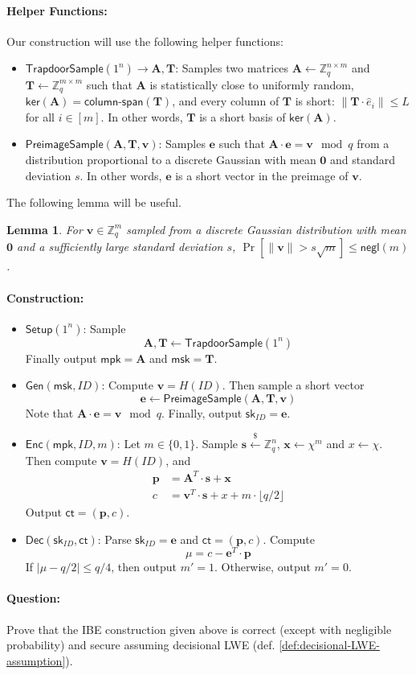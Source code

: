 \documentclass[11pt]{article}
\newtheorem{lemma}[theorem]{Lemma}
\newenvironment{solution}{\color{blue}\noindent{\bf Solution}\hspace*{1em}}{\qed\medskip}
\newcommand{\qed}{\mbox{}\hspace*{\fill}\nolinebreak\mbox{$\rule{0.6em}{0.6em}$}} %
\numberwithin{equation}{section}
\newcommand{\bfe}{\mathbf{e}}
\newcommand{\bfp}{\mathbf{p}}
\newcommand{\bfs}{\mathbf{s}}
\newcommand{\bfv}{\mathbf{v}}
\newcommand{\bfx}{\mathbf{x}}
\newcommand{\bfA}{\mathbf{A}}
\newcommand{\bfT}{\mathbf{T}}
\newcommand{\bbZ}{\mathbb{Z}}
\newcommand{\Setup}{\mathsf{Setup}}
\newcommand{\Gen}{\mathsf{Gen}}
\newcommand{\Enc}{\mathsf{Enc}}
\newcommand{\Dec}{\mathsf{Dec}}
\newcommand{\sk}{\mathsf{sk}}
\newcommand{\mpk}{\mathsf{mpk}}
\newcommand{\msk}{\mathsf{msk}}
\newcommand{\ct}{\mathsf{ct}}
\newcommand{\negl}{\mathsf{negl}}
\newcommand{\getsr}{\stackrel{\$}{\gets}}
\newcommand{\bin}{\{0,1\}}
\newcommand{\bit}{\bin}
\newif\ifsol
\begin{document}
\paragraph{Helper Functions:} Our construction will use the following helper functions:
\begin{itemize}
    \item $\mathsf{TrapdoorSample}(1^n) \to \bfA, \bfT$: Samples two matrices $\bfA \gets \bbZ_q^{n \times m}$ and $\bfT \gets \bbZ_q^{m \times m}$ such that $\bfA$ is statistically close to uniformly random, $\mathsf{ker}(\bfA) = \mathsf{column\text{-}span}(\bfT)$, and every column of $\bfT$ is short: $\|\bfT \cdot \hat{e}_i\| \leq L$ for all $i \in [m]$. In other words, $\bfT$ is a short basis of $\mathsf{ker}(\bfA)$.
    \item $\mathsf{PreimageSample}(\bfA, \bfT, \bfv)$: Samples $\bfe$ such that $\bfA \cdot \bfe = \bfv \mod q$ from a distribution proportional to a discrete Gaussian with mean $\mathbf{0}$ and standard deviation $s$. In other words, $\bfe$ is a short vector in the preimage of $\bfv$.
\end{itemize}

The following lemma will be useful.
\begin{lemma}\label{thm:gaussians-produce-small-values}
For $\bfv \in \bbZ_q^m$ sampled from a discrete Gaussian distribution with mean $\mathbf{0}$ and a sufficiently large standard deviation $s$, $\Pr[\|\bfv\| > s \sqrt{m}] \leq \negl(m)$.
\end{lemma}

\paragraph{Construction:}
\begin{itemize}
    \item $\Setup(1^n)$: Sample 
    \[\bfA, \bfT \gets \mathsf{TrapdoorSample}(1^n)\]
    Finally output $\mpk = \bfA$ and $\msk = \bfT$.
    \item $\Gen(\msk, ID)$: Compute $\bfv = H(ID)$. Then sample a short vector
    \[\bfe \gets \mathsf{PreimageSample}(\bfA, \bfT, \bfv)\]
    Note that $\bfA \cdot \bfe = \bfv \mod q$. Finally, output $\sk_{ID} = \bfe$.
    \item $\Enc(\mpk, ID, m)$: Let $m \in \bit$. Sample $\bfs \getsr \bbZ_q^n$, $\bfx \gets \chi^m$ and $x \gets \chi$. Then compute $\bfv = H(ID)$, and 
    \begin{align*}
        \bfp &= \bfA^T \cdot \bfs + \bfx\\
        c &= \bfv^T \cdot \bfs + x + m \cdot \lfloor q/2 \rfloor
    \end{align*}
    Output $\ct = (\bfp, c)$.
    \item $\Dec(\sk_{ID}, \ct)$: Parse $\sk_{ID} = \bfe$ and $\ct = (\bfp, c)$. Compute
    \[\mu = c - \bfe^T \cdot \bfp\]
    If $|\mu - q/2| \leq q/4$, then output $m'=1$. Otherwise, output $m' = 0$.
\end{itemize}

\paragraph{Question:} Prove that the IBE construction given above is correct (except with negligible probability) and secure assuming decisional LWE (def. \ref{def:decisional-LWE-assumption}).

\ifsol
\vspace{5mm}
\begin{solution}
TBD
\end{solution}
\fi
\end{document}
